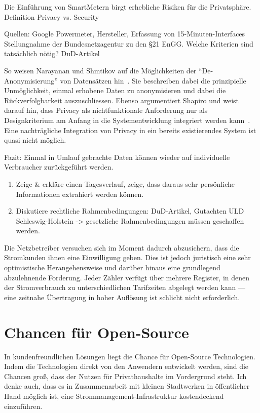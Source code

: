 \documentclass[12pt,BCOR=8.5mm]{scrartcl}
\begin{document}
Die Einführung von SmartMetern birgt erhebliche Risiken für die
Privatsphäre. Definition Privacy vs. Security

Quellen: Google Powermeter, Hersteller, Erfassung von
15-Minuten-Interfaces
Stellungnahme der Bundesnetzagentur zu den §21 EnGG. Welche Kriterien
sind tatsächlich nötig?
DuD-Artikel

So weisen Narayanan und Shmtikov auf die Möglichkeiten der
``De-Anonymisierung'' von Datensätzen hin~\cite{narayanan2010pii}. Sie
beschreiben dabei die prinzipielle Unmöglichkeit, einmal erhobene Daten
zu anonymisieren und dabei die Rückverfolgbarkeit auszuschliessen.
Ebenso argumentiert Shapiro und weist darauf hin, dass Privacy als
nichtfunktionale Anforderung nur als Designkriterium am Anfang in die
Systementwicklung integriert werden kann~\cite{shapiro2010privacy}. Eine
nachträgliche Integration von Privacy in ein bereits existierendes
System ist quasi nicht möglich.

Fazit: Einmal in Umlauf gebrachte Daten können wieder auf individuelle
Verbraucher zurückgeführt werden.


\begin{enumerate}
  \item Zeige \& erkläre einen Tagesverlauf, zeige, dass daraus sehr
	persönliche Informationen extrahiert werden können.
  \item Diskutiere rechtliche Rahmenbedingungen: DuD-Artikel, Gutachten
	ULD Schleswig-Holstein -> gesetzliche Rahmenbedingungen müssen
	geschaffen werden.
\end{enumerate}



Die Netzbetreiber versuchen sich im Moment dadurch abzusichern, dass die
Stromkunden ihnen eine Einwilligung geben. Dies ist jedoch juristisch
eine sehr optimistische Herangehensweise  und darüber hinaus eine grundlegend abzulehnende Forderung.
Jeder Zähler verfügt über mehrere Register, in denen der Stromverbrauch
zu unterschiedlichen Tarifzeiten abgelegt werden kann --- eine zeitnahe
Übertragung in hoher Auflösung ist schlicht nicht erforderlich.

\section{Chancen für Open-Source}\label{sec:chancen_open-source}
In kundenfreundlichen Lösungen liegt die Chance für Open-Source
Technologien. Indem die Technologien direkt von den Anwendern entwickelt
werden, sind die Chancen groß, dass der Nutzen für Privathaushalte im
Vordergrund steht.  Ich denke auch, dass es in Zusammenarbeit mit
kleinen Stadtwerken in öffentlicher Hand möglich ist, eine
Strommanagement-Infrastruktur kostendeckend einzuführen.
\end{document}
